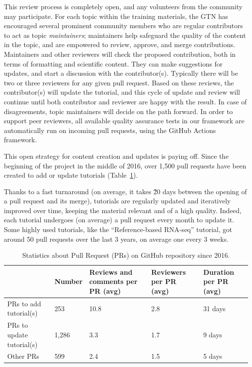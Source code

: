 \documentclass[10pt,letterpaper]{article}
\begin{document}
This review process is completely open, and any volunteers from the community may participate.
For each topic within the training materials, the GTN has encouraged several prominent community members who are regular contributors to act as topic \emph{maintainers}; maintainers help safeguard the quality of the content in the topic, and are empowered to review, approve, and merge contributions.
Maintainers and other reviewers will check the proposed contribution, both in terms of formatting and scientific content. 
They can make suggestions for updates, and start a discussion with the contributor(s). 
Typically there will be two or three reviewers for any given pull request.
Based on these reviews, the contributor(s) will update the tutorial, and this cycle of update and review will continue until both contributor and reviewer are happy with the result. In case of disagreements, topic maintainers will decide on the path forward.
In order to support peer reviewers, all available quality assurance tests in our framework are automatically run on incoming pull requests, using the GitHub Actions framework.

This open strategy for content creation and updates is paying off.
Since the beginning of the project in the middle of 2016, over 1,500 pull requests have been created to add or update tutorials (Table~\ref{tbl:pullRequestReviewing}).

Thanks to a fast turnaround (on average, it takes \~20 days between the opening of a pull request and its merge), tutorials are regularly updated and iteratively improved over time, keeping the material relevant and of a high quality.
Indeed, each tutorial undergoes (on average) a pull request every month to update it. Some highly used tutorials, like the “Reference-based RNA-seq” tutorial, got around 50 pull requests over the last 3 years, on average one every 3 weeks.

\begin{table}[]
\begin{adjustwidth}{0in}{0in} %
	\centering
	\caption{Statistics about Pull Request (PRs) on GitHub repository since 2016.\label{tbl:pullRequestReviewing}}
	\begin{tabular}{l|p{}p{}p{}p{}}
 & Number & Reviews and comments per PR (avg) & Reviewers per PR (avg) & Duration per PR (avg) \\\hline
PRs to add tutorial(s)  & 253  & 10.8  & 2.8 & 31 days\\
PRs to update tutorial(s) & 1,286 & 3.3 & 1.7 & 9 days\\
Other PRs & 599 & 2.4 & 1.5 & 5 days\\
	\end{tabular}
\end{adjustwidth}
\end{table}
\end{document}
